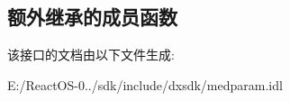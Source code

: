 \subsection*{额外继承的成员函数}


该接口的文档由以下文件生成\+:\begin{DoxyCompactItemize}
\item 
E\+:/\+React\+O\+S-\/0../sdk/include/dxsdk/medparam.\+idl\end{DoxyCompactItemize}
